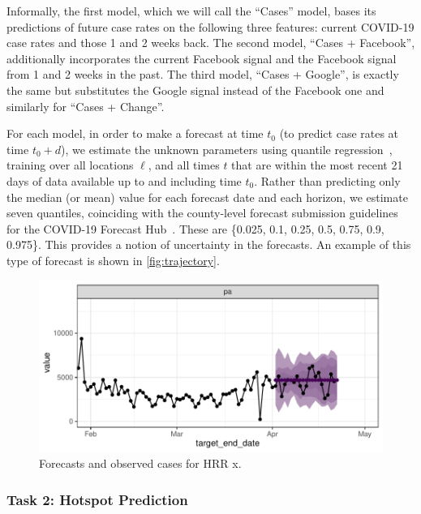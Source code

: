\documentclass[9pt,twocolumn,twoside,lineno]{pnas-new}
\begin{document}
Informally, the first model, which we will call the ``Cases'' model, 
bases its predictions of future case rates on the following three features:
current COVID-19 case rates and those 1 and 2 weeks back.
The second model, ``Cases + Facebook'', additionally incorporates the 
current Facebook signal and the Facebook signal from 1 and 2 weeks in the past.
The third model, ``Cases + Google'', is exactly the same but substitutes the 
Google signal instead of the Facebook one and similarly for ``Cases + Change''.


For each model, in order to make a forecast at time $t_0$
(to predict case rates at time $t_0+d$),
we estimate the unknown parameters using quantile
regression~\cite{KoenkerXiao2006}, 
training over all locations $\ell$,
and all times $t$ that are within the most recent 21 days of data
available up to and including time $t_0$.
Rather than predicting only the median (or mean) value for each forecast date
and each horizon, we estimate seven quantiles, coinciding 
with the county-level forecast submission guidelines for the
COVID-19 Forecast Hub~\cite{Cramer:2021}.  These are \{0.025, 0.1,
0.25, 0.5, 
0.75, 0.9, 0.975\}. This provides a notion of uncertainty in the forecasts. An
example of this type of forecast is shown in \autoref{fig:trajectory}. 

\begin{figure}[tb!]
    \centering
    \includegraphics[width=.9\linewidth]{fig/trajectory.pdf}
    \caption{Forecasts and observed cases for HRR x. } 
    \label{fig:trajectory}
\end{figure}





\subsubsection{Task 2: Hotspot Prediction}
\end{document}
